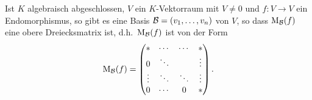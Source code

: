 \documentclass[a4paper,10pt]{article}
\begin{document}
\begin{corollary}
  Ist $K$ algebraisch abgeschlossen, $V$ ein $K$-Vektorraum mit $V \neq 0$ und $f \colon V \to V$ ein Endomorphismus, so gibt es eine Basis $\mathcal{B} = (v_1, \dotsc, v_n)$ von $V$, so dass $\operatorname{M}_{\mathcal{B}}(f)$ eine obere Dreiecksmatrix ist, d.h.\ $\operatorname{M}_{\mathcal{B}}(f)$ ist von der Form
  \[
    \operatorname{M}_{\mathcal{B}}(f)
    =
    \begin{pmatrix}
      *       & \cdots  & \cdots  & *       \\
      0       & \ddots  &         & \vdots  \\
      \vdots  & \ddots  & \ddots  & \vdots  \\
      0       & \cdots  & 0       & *
    \end{pmatrix}.
  \]
\end{corollary}
\end{document}
